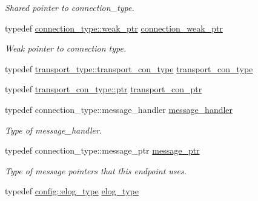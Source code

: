 \begin{DoxyCompactItemize}
\begin{DoxyCompactList}\small\item\em Shared pointer to connection\+\_\+type. \end{DoxyCompactList}\item 
typedef \hyperlink{classwebsocketpp_1_1connection_ac2905dcf6418c52ec9685f9f59b86e3e}{connection\+\_\+type\+::weak\+\_\+ptr} \hyperlink{classwebsocketpp_1_1endpoint_afc1de254d2c4cf68ef29aae7189edb26}{connection\+\_\+weak\+\_\+ptr}\hypertarget{classwebsocketpp_1_1endpoint_afc1de254d2c4cf68ef29aae7189edb26}{}\label{classwebsocketpp_1_1endpoint_afc1de254d2c4cf68ef29aae7189edb26}

\begin{DoxyCompactList}\small\item\em Weak pointer to connection type. \end{DoxyCompactList}\item 
typedef \hyperlink{classwebsocketpp_1_1transport_1_1asio_1_1endpoint_a75f3102766fd3ba8230e99a2b0e00457}{transport\+\_\+type\+::transport\+\_\+con\+\_\+type} \hyperlink{classwebsocketpp_1_1endpoint_aaec9d745cafcee505c63efff421e3dff}{transport\+\_\+con\+\_\+type}
\item 
typedef \hyperlink{classwebsocketpp_1_1transport_1_1asio_1_1connection_aa6f25556860a154c4dacb4dac1dce8e4}{transport\+\_\+con\+\_\+type\+::ptr} \hyperlink{classwebsocketpp_1_1endpoint_a22be3833280c548d724298eba0f00b2a}{transport\+\_\+con\+\_\+ptr}
\item 
typedef connection\+\_\+type\+::message\+\_\+handler \hyperlink{classwebsocketpp_1_1endpoint_afa2109f793a8d8d90599ea339bbcd8e5}{message\+\_\+handler}\hypertarget{classwebsocketpp_1_1endpoint_afa2109f793a8d8d90599ea339bbcd8e5}{}\label{classwebsocketpp_1_1endpoint_afa2109f793a8d8d90599ea339bbcd8e5}

\begin{DoxyCompactList}\small\item\em Type of message\+\_\+handler. \end{DoxyCompactList}\item 
typedef connection\+\_\+type\+::message\+\_\+ptr \hyperlink{classwebsocketpp_1_1endpoint_a585ecbbfd9689d4e4229e4c8378bd672}{message\+\_\+ptr}\hypertarget{classwebsocketpp_1_1endpoint_a585ecbbfd9689d4e4229e4c8378bd672}{}\label{classwebsocketpp_1_1endpoint_a585ecbbfd9689d4e4229e4c8378bd672}

\begin{DoxyCompactList}\small\item\em Type of message pointers that this endpoint uses. \end{DoxyCompactList}\item 
typedef \hyperlink{classwebsocketpp_1_1log_1_1stub}{config\+::elog\+\_\+type} \hyperlink{classwebsocketpp_1_1endpoint_a4ab98f4fed5b5b2740105eff732c7b1e}{elog\+\_\+type}\hypertarget{classwebsocketpp_1_1endpoint_a4ab98f4fed5b5b2740105eff732c7b1e}{}\label{classwebsocketpp_1_1endpoint_a4ab98f4fed5b5b2740105eff732c7b1e}


\end{DoxyCompactItemize}
